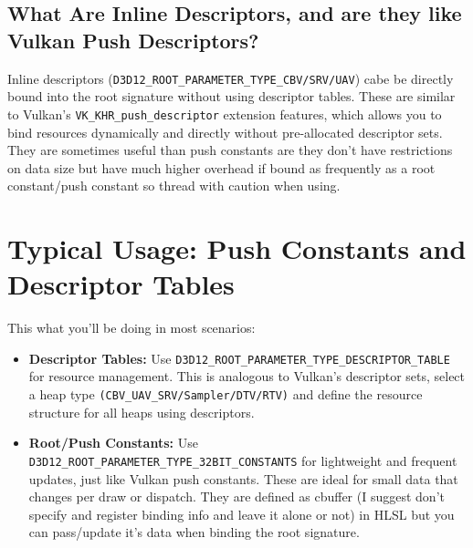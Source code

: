 \documentclass{article}
\begin{document}
\subsection*{What Are Inline Descriptors, and are they like Vulkan Push Descriptors?}
Inline descriptors (\lstinline{D3D12_ROOT_PARAMETER_TYPE_CBV/SRV/UAV}) cabe be directly bound into the root signature without using descriptor tables. These are similar to Vulkan's \lstinline{VK_KHR_push_descriptor} extension features, which allows you to bind resources dynamically and directly without pre-allocated descriptor sets. They are sometimes useful than push constants are they don't have restrictions on data size but have much higher overhead if bound as frequently as a root constant/push constant so thread with caution when using.


\section*{Typical Usage: Push Constants and Descriptor Tables}
This what you'll be doing in most scenarios:

\begin{itemize}
    \item \textbf{Descriptor Tables:} Use \lstinline{D3D12_ROOT_PARAMETER_TYPE_DESCRIPTOR_TABLE} for resource management. This is  analogous to Vulkan's descriptor sets, select a heap type \lstinline{(CBV_UAV_SRV/Sampler/DTV/RTV)} and define the resource structure for all heaps using descriptors.
    \item \textbf{Root/Push Constants:} Use \lstinline{D3D12_ROOT_PARAMETER_TYPE_32BIT_CONSTANTS} for lightweight and frequent updates, just like Vulkan push constants. These are ideal for small data that changes per draw or dispatch. They are defined as cbuffer (I suggest don't specify and register binding info and leave it alone or not) in HLSL but you can pass/update it's data when binding the root signature.
\end{itemize}
\end{document}
